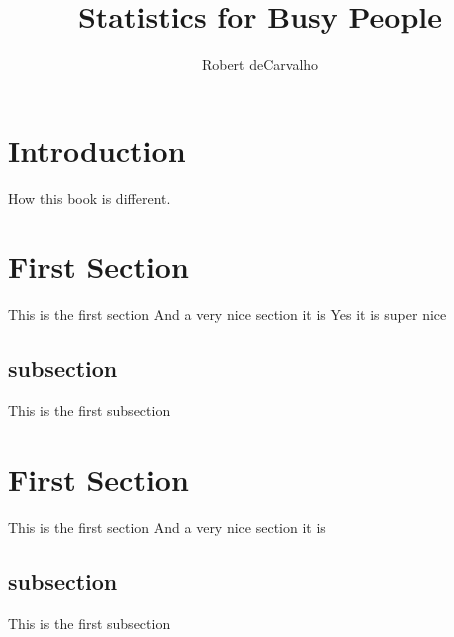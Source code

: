 \documentclass[11pt, oneside]{article}   	%
\title{Statistics for Busy People}
\author{Robert deCarvalho}
\date{}							%
\begin{document}
\maketitle

\section{Introduction}
How this book is different. \break


\section{First Section}
This is the first section
And a very nice section it is
Yes it is super nice
\subsection{subsection}
This is the first subsection

\section{First Section}
This is the first section
And a very nice section it is
\subsection{subsection}
This is the first subsection
\end{document}
